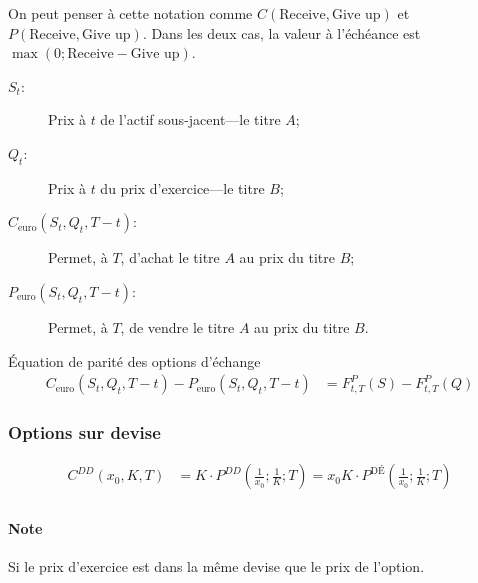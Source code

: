 \documentclass[10pt, french]{article}
\begin{document}
\begin{multicols*}{2}
On peut penser à cette notation comme $C(\text{Receive}, \text{Give up})$ et $P(\text{Receive}, \text{Give up})$. Dans les deux cas, la valeur à l'échéance est $\max(0; \text{Receive} - \text{Give up})$.

\begin{distributions}
\begin{description}
	\item[$S_{t}$:] Prix à $t$ de l'actif sous-jacent---le titre $A$;
	\item[$Q_{t}$:] Prix à $t$ du prix d'exercice---le titre $B$;
	\item[$C_{\text{euro}}(S_{t}, Q_{t}, T - t)$:] Permet, à $T$, d'achat le titre $A$ au prix du titre $B$;
	\item[$P_{\text{euro}}(S_{t}, Q_{t}, T - t)$:] Permet, à $T$, de vendre le titre $A$ au prix du titre $B$.
\end{description}
\end{distributions}

\begin{rappel}{Équation de parité des options d'échange}
\begin{align*}
	C_{\text{euro}}(S_t, Q_t, T - t) - P_{\text{euro}}(S_t, Q_t, T-t) 
	&= 	F_{t,T}^{P}(S) - F_{t,T}^{P}(Q)
\end{align*}
\end{rappel}


\subsubsection*{Options sur devise}
\begin{align*}
	C^{DD}(x_0, K, T) 
	&= 	K \cdot P^{DD}\left( \frac{1}{x_0}; \frac{1}{K}; T \right) 
	= 	x_0	K \cdot P^{\text{DÉ}} \left( \frac{1}{x_0}; \frac{1}{K}; T \right) \\
\end{align*}

\paragraph{Note}	Si le prix d'exercice est dans la même devise que le prix de l'option.


\end{multicols*}
\end{document}

